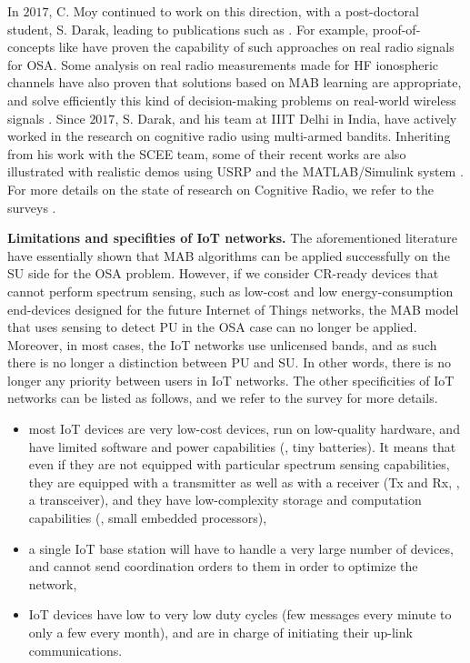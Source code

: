 In $2017$, C. Moy continued to work on this direction, with a post-doctoral student, S. Darak, leading to publications such as
\cite{darak2016bayesian,Darak16}.
%
For example, proof-of-concepts like \cite{kumar2016two} have proven the capability of such approaches on real radio signals for OSA.
%
Some analysis on real radio measurements made for HF ionospheric channels have also proven that solutions based on MAB learning are appropriate, and solve efficiently this kind of decision-making problems on real-world wireless signals \cite{Melian15}.
%
Since $2017$, S. Darak, and his team at IIIT Delhi in India, have actively worked in the research on cognitive radio using multi-armed bandits.
Inheriting from his work with the SCEE team,
some of their recent works are also illustrated with realistic demos using USRP and the MATLAB/Simulink system
\cite{KumarYadav2018,SawantKumar2018,JoshiKumar2018}.
%
For more details on the state of research on Cognitive Radio, we refer to the surveys \cite{garhwal2012survey,marinho2012cognitive}.



\textbf{Limitations and specifities of IoT networks.}
%
The aforementioned literature have essentially shown that MAB algorithms can be applied successfully on the SU side for the OSA problem.
However, if we consider CR-ready devices that cannot perform spectrum sensing, such as low-cost and low energy-consumption end-devices designed for the future Internet of Things networks, the MAB model that uses sensing to detect PU in the OSA case can no longer be applied.
Moreover, in most cases, the IoT networks use unlicensed bands, and as such there is no longer a distinction between PU and SU.
In other words, there is no longer any priority between users in IoT networks.
%
The other specificities of IoT networks can be listed as follows,
and we refer to the survey \cite{Centenaro16} for more details.
\begin{itemize}\tightlist
    \item
    most IoT devices are very low-cost devices, run on low-quality hardware, and have limited software and power capabilities (\ie, tiny batteries).
    It means that even if they are not equipped with particular spectrum sensing capabilities,
    they are equipped with a transmitter as well as with a receiver (Tx and Rx, \ie, a transceiver),
    and they have low-complexity storage and computation capabilities (\ie, small embedded processors),
    \item
    a single IoT base station will have to handle a very large number of devices,
    and cannot send coordination orders to them in order to optimize the network,
    \item
    IoT devices have low to very low duty cycles (few messages every minute to only a few every month), and are in charge of initiating their up-link communications.
\end{itemize}

